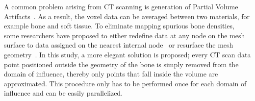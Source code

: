 \documentclass[review]{elsarticle}
\numberwithin{equation}{section}
\begin{document}
A common problem arising from CT scanning is generation of Partial Volume Artifacts~\citep{adams2009quantitative}. As a result, the voxel data can be averaged between two materials, for example bone and soft tissue.
To eliminate mapping spurious bone densities, some researchers have proposed to either redefine data at any node on the mesh surface to data assigned on the nearest internal node~\citep{helgason2008modified, chen2010new} or resurface the mesh geometry~\citep{peleg2014can}. 
In this study, a more elegant solution is proposed; every CT scan data point positioned outside the geometry of the bone is simply removed from the domain of influence, thereby only points that fall inside the volume are approximated. 
This procedure only has to be performed once for each domain of influence  and can be easily parallelized. %
\end{document}
